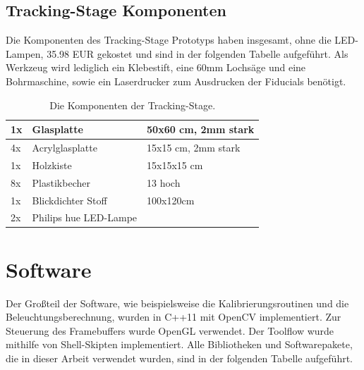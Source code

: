  \subsection{Tracking-Stage Komponenten}
  Die Komponenten des Tracking-Stage Prototyps haben  insgesamt, ohne die LED-Lampen, 35.98 
EUR gekostet und sind in der folgenden Tabelle aufgeführt. Als Werkzeug wird lediglich ein Klebestift, eine 60mm Lochsäge und eine Bohrmaschine, sowie ein Laserdrucker zum Ausdrucken der Fiducials benötigt.

 \begin{table}[H]
 \begin{tabular}{|l|l|l|}
    \hline 
    1x & Glasplatte & 50x60 cm, 2mm stark \\
   \hline
    4x & Acrylglasplatte & 15x15 cm, 2mm stark \\
   \hline
    1x & Holzkiste & 15x15x15 cm \\
   \hline
    8x & Plastikbecher & 13 hoch \\
   \hline
    1x & Blickdichter Stoff & 100x120cm \\
   \hline
    2x & Philips hue \cite{hue} LED-Lampe & \\
    \hline 
  \end{tabular} 
  \label{tab:bom}
  \caption[Komponenten der Tracking-Stage]{Die Komponenten der Tracking-Stage.}
 \end{table}



\section{Software}
   
   Der Großteil der Software, wie beispielsweise die Kalibrierungsroutinen und die Beleuchtungsberechnung, wurden in C++11 mit OpenCV  \cite{opencv} implementiert. Zur Steuerung des Framebuffers wurde OpenGL verwendet. 
   Der Toolflow  wurde mithilfe von  Shell-Skipten implementiert.
   Alle Bibliotheken und Softwarepakete, die in dieser Arbeit verwendet wurden, sind in der folgenden Tabelle aufgeführt.

